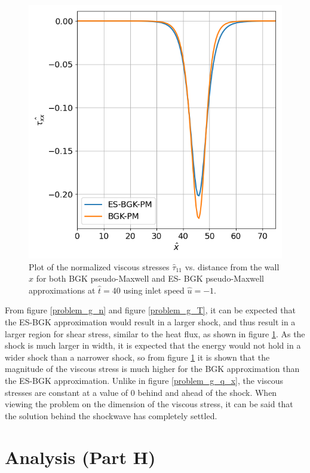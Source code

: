 \documentclass[a4paper]{article}
\begin{document}
\begin{figure}[hbt!]
    \centering
    \includegraphics[width=14cm]{plots/problem_g_tau_xx.png}
    \caption{\centering Plot of the normalized viscous stresses $\hat{\tau}_{11}$ vs. distance from the wall $\hat{x}$ for both BGK pseudo-Maxwell and ES- BGK pseudo-Maxwell approximations at $\hat{t} = 40$ using inlet speed $\hat{u} = -1$.}
    \label{problem_g_tau_xx}
\end{figure}
From figure \ref{problem_g_n} and figure \ref{problem_g_T}, it can be expected that the ES-BGK approximation would result in a larger shock, and thus result in a larger region for shear stress, similar to the heat flux, as shown in figure \ref{problem_g_tau_xx}. As the shock is much larger in width, it is expected that the energy would not hold in a wider shock than a narrower shock, so from figure \ref{problem_g_tau_xx} it is shown that the magnitude of the viscous stress is much higher for the BGK approximation than the ES-BGK approximation. Unlike in figure \ref{problem_g_q_x}, the viscous stresses are constant at a value of $0$ behind and ahead of the shock. When viewing the problem on the dimension of the viscous stress, it can be said that the solution behind the shockwave has completely settled. 

\clearpage
\section{Analysis (Part H)}
\end{document}
